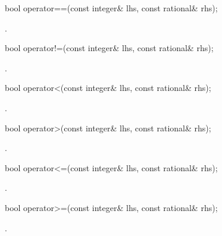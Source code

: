 \begin{itemdecl}
bool operator==(const integer& lhs, const rational& rhs);
\end{itemdecl}

\begin{itemdescr}
\returns {}.
\end{itemdescr}

\begin{itemdecl}
bool operator!=(const integer& lhs, const rational& rhs);
\end{itemdecl}

\begin{itemdescr}
\returns {}.
\end{itemdescr}

\begin{itemdecl}
bool operator<(const integer& lhs, const rational& rhs);
\end{itemdecl}

\begin{itemdescr}
\returns {}.
\end{itemdescr}

\begin{itemdecl}
bool operator>(const integer& lhs, const rational& rhs);
\end{itemdecl}

\begin{itemdescr}
\returns {}.
\end{itemdescr}

\begin{itemdecl}
bool operator<=(const integer& lhs, const rational& rhs);
\end{itemdecl}

\begin{itemdescr}
\returns {}.
\end{itemdescr}

\begin{itemdecl}
bool operator>=(const integer& lhs, const rational& rhs);
\end{itemdecl}

\begin{itemdescr}
\returns {}.
\end{itemdescr}